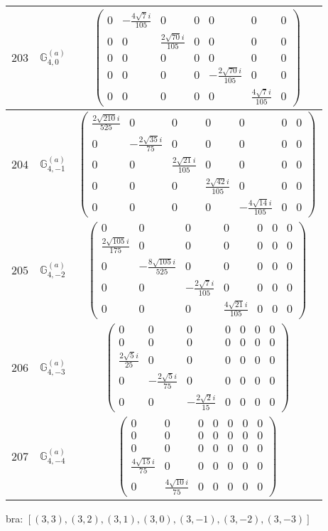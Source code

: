 \documentclass[fleqn,8pt,landscape]{jsarticle}
\begin{document}
\begin{center}
\begin{longtable}{ccc}
$ 203 $ & $ \mathbb{G}_{4,0}^{(a)} $ & $ \begin{pmatrix} 0 & - \frac{4 \sqrt{7} i}{105} & 0 & 0 & 0 & 0 & 0 \\ 0 & 0 & \frac{2 \sqrt{70} i}{105} & 0 & 0 & 0 & 0 \\ 0 & 0 & 0 & 0 & 0 & 0 & 0 \\ 0 & 0 & 0 & 0 & - \frac{2 \sqrt{70} i}{105} & 0 & 0 \\ 0 & 0 & 0 & 0 & 0 & \frac{4 \sqrt{7} i}{105} & 0 \end{pmatrix} $ \\ \hline
$ 204 $ & $ \mathbb{G}_{4,-1}^{(a)} $ & $ \begin{pmatrix} \frac{2 \sqrt{210} i}{525} & 0 & 0 & 0 & 0 & 0 & 0 \\ 0 & - \frac{2 \sqrt{35} i}{75} & 0 & 0 & 0 & 0 & 0 \\ 0 & 0 & \frac{2 \sqrt{21} i}{105} & 0 & 0 & 0 & 0 \\ 0 & 0 & 0 & \frac{2 \sqrt{42} i}{105} & 0 & 0 & 0 \\ 0 & 0 & 0 & 0 & - \frac{4 \sqrt{14} i}{105} & 0 & 0 \end{pmatrix} $ \\ \hline
$ 205 $ & $ \mathbb{G}_{4,-2}^{(a)} $ & $ \begin{pmatrix} 0 & 0 & 0 & 0 & 0 & 0 & 0 \\ \frac{2 \sqrt{105} i}{175} & 0 & 0 & 0 & 0 & 0 & 0 \\ 0 & - \frac{8 \sqrt{105} i}{525} & 0 & 0 & 0 & 0 & 0 \\ 0 & 0 & - \frac{2 \sqrt{7} i}{105} & 0 & 0 & 0 & 0 \\ 0 & 0 & 0 & \frac{4 \sqrt{21} i}{105} & 0 & 0 & 0 \end{pmatrix} $ \\ \hline
$ 206 $ & $ \mathbb{G}_{4,-3}^{(a)} $ & $ \begin{pmatrix} 0 & 0 & 0 & 0 & 0 & 0 & 0 \\ 0 & 0 & 0 & 0 & 0 & 0 & 0 \\ \frac{2 \sqrt{5} i}{25} & 0 & 0 & 0 & 0 & 0 & 0 \\ 0 & - \frac{2 \sqrt{5} i}{75} & 0 & 0 & 0 & 0 & 0 \\ 0 & 0 & - \frac{2 \sqrt{2} i}{15} & 0 & 0 & 0 & 0 \end{pmatrix} $ \\ \hline
$ 207 $ & $ \mathbb{G}_{4,-4}^{(a)} $ & $ \begin{pmatrix} 0 & 0 & 0 & 0 & 0 & 0 & 0 \\ 0 & 0 & 0 & 0 & 0 & 0 & 0 \\ 0 & 0 & 0 & 0 & 0 & 0 & 0 \\ \frac{4 \sqrt{15} i}{75} & 0 & 0 & 0 & 0 & 0 & 0 \\ 0 & \frac{4 \sqrt{10} i}{75} & 0 & 0 & 0 & 0 & 0 \end{pmatrix} $ \\
\end{longtable}
\end{center}
bra: $[(3,3),(3,2),(3,1),(3,0),(3,-1),(3,-2),(3,-3)]$
\end{document}
